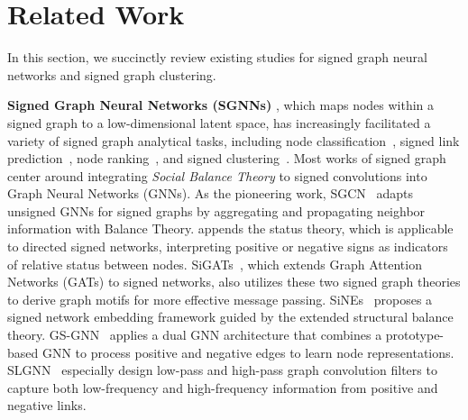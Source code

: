 \section{Related Work}
In this section, we succinctly review existing studies for signed graph neural networks and signed graph clustering.

\textbf{Signed Graph Neural Networks (SGNNs)}
, which maps nodes within a signed graph to a low-dimensional latent space, has increasingly facilitated a variety of signed graph analytical tasks, including node classification~\cite{bosch2018node}, signed link prediction~\cite{islam2018signet,xu2019link,zhang2024dropedge,jung2020signed}, node ranking~\cite{chung2013dirichlet,shahriari2014ranking}, and signed clustering~\cite{tzeng2020discovering, kunegis2010spectral, chiang2012scalable,cucuringu2019sponge,he2022sssnet}. 
Most works of signed graph center around integrating \textit{Social Balance Theory} to signed convolutions into Graph Neural Networks (GNNs). As the pioneering work, SGCN~\cite{derr2018signed} adapts unsigned GNNs for signed graphs by aggregating and propagating neighbor information with Balance Theory. 
\cite{chen2018bridge} appends the status theory, which is applicable to directed signed networks, interpreting positive or negative signs as indicators of relative status between nodes.
SiGATs~\cite{huang2019signed}, which extends Graph Attention Networks (GATs) to signed networks, also utilizes these two signed graph theories to derive graph motifs for more effective message passing. %
SiNEs~\cite{wang2017signed} proposes a signed network embedding framework guided by the extended structural balance theory. 
GS-GNN~\cite{liu2021signed} applies a dual GNN architecture that combines a prototype-based GNN to process positive and negative edges to learn node representations. SLGNN~\cite{li2023signed}
especially design low-pass and high-pass graph convolution filters to capture both low-frequency and high-frequency information from positive and negative links. 

